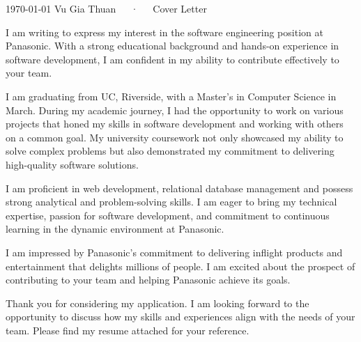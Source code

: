 \documentclass[11pt, a4paper]{derwent-cv}
\def\companyname{Panasonic}
\def\companystatement{delivering inflight products and entertainment that delights millions of people}
\begin{document}
\makedercvheader[C]

\makecvfooter
{\today}
{Vu Gia Thuan~~~·~~~Cover Letter}
{}

\makelettertitle

\begin{cvletter}
	I am writing to express my interest in the software engineering position at \companyname. With a strong educational background and hands-on experience in software development, I am confident in my ability to contribute effectively to your team.

	I am graduating from UC, Riverside, with a Master's in Computer Science in March. During my academic journey, I had the opportunity to work on various projects that honed my skills in software development and working with others on a common goal. My university coursework not only showcased my ability to solve complex problems but also demonstrated my commitment to delivering high-quality software solutions.

	I am proficient in web development, relational database management and possess strong analytical and problem-solving skills. I am eager to bring my technical expertise, passion for software development, and commitment to continuous learning in the dynamic environment at \companyname.

	I am impressed by \companyname's commitment to \companystatement. I am excited about the prospect of contributing to your team and helping \companyname{} achieve its goals.

	Thank you for considering my application. I am looking forward to the opportunity to discuss how my skills and experiences align with the needs of your team. Please find my resume attached for your reference.

\end{cvletter}
\makederletterclosing
\end{document}
